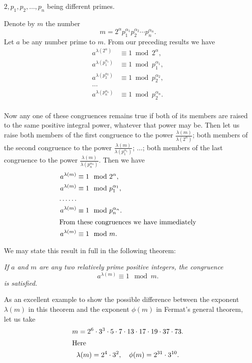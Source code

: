 {$2, p_1, p_2, \ldots, p_n$ being different primes.%

Denote by $m$ the number
\begin{equation*}
m = 2^{\alpha}p_1^{\alpha_1}p_2^{\alpha_2} \cdots p_n^{\alpha_n}.
\end{equation*}
Let $a$ be any number prime to $m$. From our preceding results we
have
\begin{align*}
a^{\lambda(2^{\alpha})}     &\equiv 1 \bmod 2^{\alpha}, \\
a^{\lambda(p_1^{\alpha_1})} &\equiv 1 \bmod p_1^{\alpha_1},\\
a^{\lambda(p_2^{\alpha_2})} &\equiv 1 \bmod p_2^{\alpha_2}, \\
\ldots \\
a^{\lambda(p_n^{\alpha_n})} &\equiv 1 \bmod p_2^{\alpha_n}. \\
\end{align*}

Now any one of these congruences remains true if both of its members
are raised to the same positive integral power, whatever that power
may be. Then let us raise both members of the first congruence to
the power $\frac{\lambda(m)}{\lambda(2^\alpha)}$; both members of
the second congruence to the power
$\frac{\lambda(m)}{\lambda(p_1^{\alpha_1})}$; $\ldots$; both members
of the last congruence to the power
$\frac{\lambda(m)}{\lambda(p_n^{\alpha_n})}$. Then we have
\begin{align*}
a^{\lambda(m)} &\equiv 1 \mod 2^\alpha, \\
a^{\lambda(m)} &\equiv 1 \mod p_1^{\alpha_1}, \\
\ldots \ldots \\
a^{\lambda(m)} &\equiv 1 \mod p_n^{\alpha_n}. \\
\intertext{From these congruences we have immediately}
a^{\lambda(m)} &\equiv 1 \mod m.
\end{align*}

We may state this result in full in the following theorem:

\smallskip \emph{If $a$ and $m$ are any two relatively prime positive
integers, the congruence}
\begin{equation*}
a^{\lambda(m)} \equiv 1 \mod m.
\end{equation*}
\emph{is satisfied.}

As an excellent example to show the possible difference between the
exponent $\lambda(m)$ in this theorem and the exponent $\phi(m)$ in
Fermat's general theorem, let us take
\begin{gather*}
m = 2^6 \cdot 3^3 \cdot 5 \cdot 7 \cdot 13 \cdot 17 \cdot 19
        \cdot 37 \cdot 73. \\
\intertext{Here}
\lambda(m) = 2^4 \cdot 3^2, \quad \phi(m) = 2^{31} \cdot 3^{10}.
\end{gather*}

}
